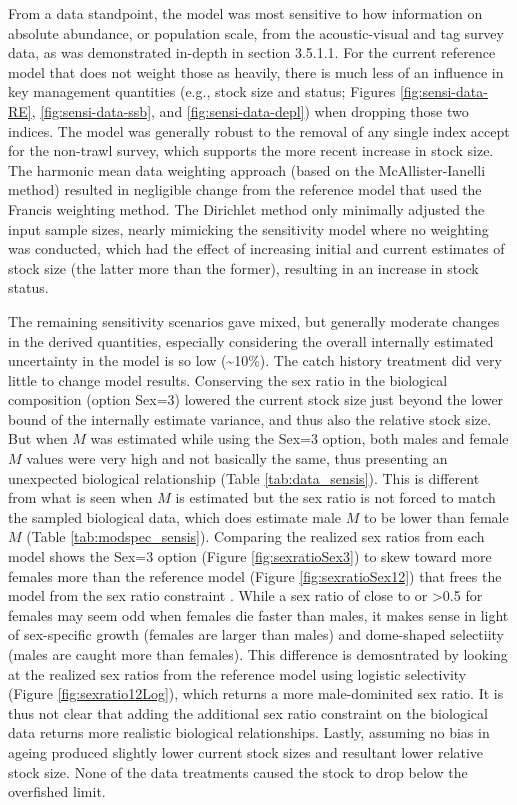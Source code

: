 \documentclass[11pt,
  letterpaper,
]{article}
\begin{document}
From a data standpoint, the model was most sensitive to how information on absolute abundance, or population scale, from the acoustic-visual and tag survey data, as was demonstrated in-depth in section 3.5.1.1. For the current reference model that does not weight those as heavily, there is much less of an influence in key management quantities (e.g., stock size and status; Figures \ref{fig:sensi-data-RE}, \ref{fig:sensi-data-ssb}, and \ref{fig:sensi-data-depl}) when dropping those two indices. The model was generally robust to the removal of any single index accept for the non-trawl survey, which supports the more recent increase in stock size. The harmonic mean data weighting approach (based on the McAllister-Ianelli method) resulted in negligible change from the reference model that used the Francis weighting method. The Dirichlet method only minimally adjusted the input sample sizes, nearly mimicking the sensitivity model where no weighting was conducted, which had the effect of increasing initial and current estimates of stock size (the latter more than the former), resulting in an increase in stock status.

The remaining sensitivity scenarios gave mixed, but generally moderate changes in the derived quantities, especially considering the overall internally estimated uncertainty in the model is so low (\textasciitilde10\%). The catch history treatment did very little to change model results. Conserving the sex ratio in the biological composition (option Sex=3) lowered the current stock size just beyond the lower bound of the internally estimate variance, and thus also the relative stock size. But when \(M\) was estimated while using the Sex=3 option, both males and female \(M\) values were very high and not basically the same, thus presenting an unexpected biological relationship (Table \ref{tab:data_sensis}). This is different from what is seen when \(M\) is estimated but the sex ratio is not forced to match the sampled biological data, which does estimate male \(M\) to be lower than female \(M\) (Table \ref{tab:modspec_sensis}). Comparing the realized sex ratios from each model shows the Sex=3 option (Figure \ref{fig:sexratioSex3}) to skew toward more females more than the reference model (Figure \ref{fig:sexratioSex12}) that frees the model from the sex ratio constraint . While a sex ratio of close to or \textgreater0.5 for females may seem odd when females die faster than males, it makes sense in light of sex-specific growth (females are larger than males) and dome-shaped selectiity (males are caught more than females). This difference is demosntrated by looking at the realized sex ratios from the reference model using logistic selectivity (Figure \ref{fig:sexratio12Log}), which returns a more male-dominited sex ratio. It is thus not clear that adding the additional sex ratio constraint on the biological data returns more realistic biological relationships. Lastly, assuming no bias in ageing produced slightly lower current stock sizes and resultant lower relative stock size. None of the data treatments caused the stock to drop below the overfished limit.
\end{document}
